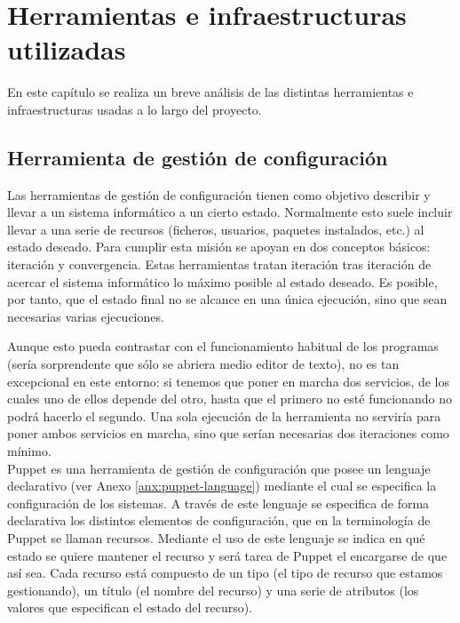 \chapter{Herramientas e infraestructuras utilizadas}
\label{cap:herramientas}


En este capítulo se realiza un breve análisis de las distintas herramientas e infraestructuras usadas a lo largo del proyecto.


\section{Herramienta de gestión de configuración}

Las herramientas de gestión de configuración tienen como objetivo describir y llevar a un sistema informático a un cierto estado. Normalmente esto suele incluir llevar a una serie de recursos (ficheros, usuarios, paquetes instalados, etc.) al estado deseado. Para cumplir esta misión se apoyan en dos conceptos básicos: iteración y convergencia. Estas herramientas tratan iteración tras iteración de acercar el sistema informático lo máximo posible al estado deseado. Es posible, por tanto, que el estado final no se alcance en una única ejecución, sino que sean necesarias varias ejecuciones.

Aunque esto pueda contrastar con el funcionamiento habitual de los programas (sería sorprendente que sólo se abriera medio editor de texto), no es tan excepcional en este entorno: si tenemos que poner en marcha dos servicios, de los cuales uno de ellos depende del otro, hasta que el primero no esté funcionando no podrá hacerlo el segundo. Una sola ejecución de la herramienta no serviría para poner ambos servicios en marcha, sino que serían necesarias dos iteraciones como mínimo. \\

Puppet \cite{puppetlabs} es una herramienta de gestión de configuración que posee un lenguaje declarativo (ver Anexo \ref{anx:puppet-language}) mediante el cual se especifica la configuración de los sistemas. A través de este lenguaje se especifica de forma declarativa los distintos elementos de configuración, que en la terminología de Puppet se llaman recursos. Mediante el uso de este lenguaje se indica en qué estado se quiere mantener el recurso y será tarea de Puppet el encargarse de que así sea. Cada recurso está compuesto de un tipo (el tipo de recurso que estamos gestionando), un título (el nombre del recurso) y una serie de atributos (los valores que especifican el estado del recurso). 

